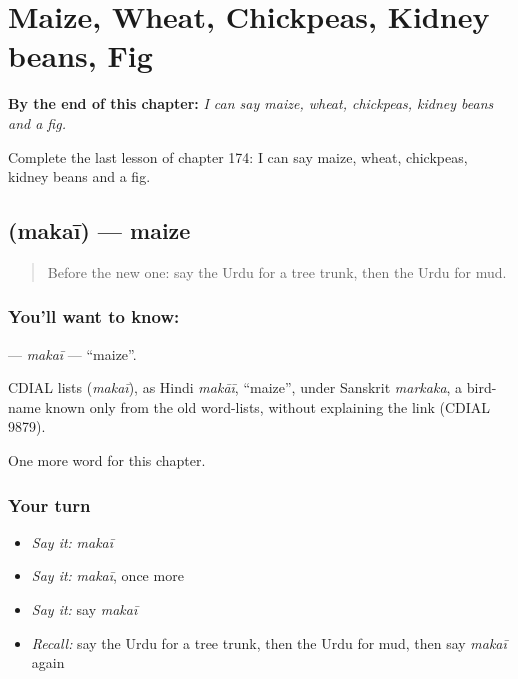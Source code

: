 
\chapter{Maize, Wheat, Chickpeas, Kidney beans, Fig}
\label{ch:ur-maize-wheat-chickpeas-kidney-beans-fig}

\begin{chapteropening}
\textbf{By the end of this chapter:} \emph{I can say maize, wheat, chickpeas, kidney beans and a fig.}

Complete the last lesson of chapter 174: I can say maize, wheat, chickpeas, kidney beans and a fig.
\end{chapteropening}

\section[\texorpdfstring{\ur{مکئی} (makaī)}{مکئی (makaī)}]{ (makaī) — maize}

\label{lesson:UR-C174-makai}



\begin{quote}
Before the new one: say the Urdu for a tree trunk, then the Urdu for mud.
\end{quote}

\subsection*{You'll want to know: }
\textbf{} — \emph{makaī} — \textquotedblleft{}maize\textquotedblright{}.

\begin{cousinweb}
CDIAL lists \textbf{} (\emph{makaī}), as Hindi \emph{makāī}, \textquotedblleft{}maize\textquotedblright{}, under Sanskrit \emph{markaka}, a bird-name known only from the old word-lists, without explaining the link (CDIAL 9879).
\end{cousinweb}

\begin{grammarlens}[title={What you've built}]
One more word for this chapter.
\end{grammarlens}

\subsection*{Your turn}
\begin{itemize}
\raggedright
  \item \emph{Say it:} \emph{makaī}
  \item \emph{Say it:} \emph{makaī}, once more
  \item \emph{Say it:} say \emph{makaī}
  \item \emph{Recall:} say the Urdu for a tree trunk, then the Urdu for mud, then say \emph{makaī} again
\end{itemize}

